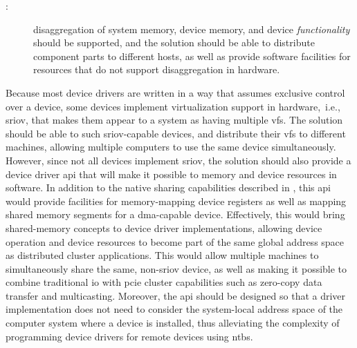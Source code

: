     
\begin{description}
    \item[:] \Gls{disaggregation} of system memory, device memory, and device \emph{functionality} should be supported, and the solution should be able to distribute component parts to different hosts, as well as provide software facilities for resources that do not support \gls{disaggregation} in hardware.
\end{description}
Because most device drivers are written in a way that assumes exclusive control over a device, some devices implement virtualization support in hardware,~i.e., \gls{sriov}, that makes them appear to a system as having multiple \glspl{vf}. 
%
The solution should be able to  such \gls{sriov}-capable devices, and distribute their \glspl{vf} to different machines, allowing multiple computers to use the same device simultaneously.
%
However, since not all devices implement \gls{sriov}, the solution should also provide a device driver \gls{api} that will make it possible to  memory and device resources in software.
%
In addition to the native sharing capabilities described in , this \gls{api} 
would provide facilities for memory-mapping device registers as well as mapping shared memory segments for a \gls{dma}-capable device.
%
Effectively, this would bring shared-memory concepts to device driver implementations, allowing device operation and device resources to become part of the same global address space as distributed cluster applications.
%
This would allow multiple machines to simultaneously share the same, non-\gls{sriov} device, as well as making it possible to combine traditional \gls{io} with \gls{pcie} cluster capabilities such as zero-copy data transfer and multicasting.
%
Moreover, the \gls{api} should be designed so that a driver implementation does not need to consider the system-local address space of the computer system where a device is installed, thus alleviating the complexity of programming device drivers for remote devices using \glspl{ntb}.

